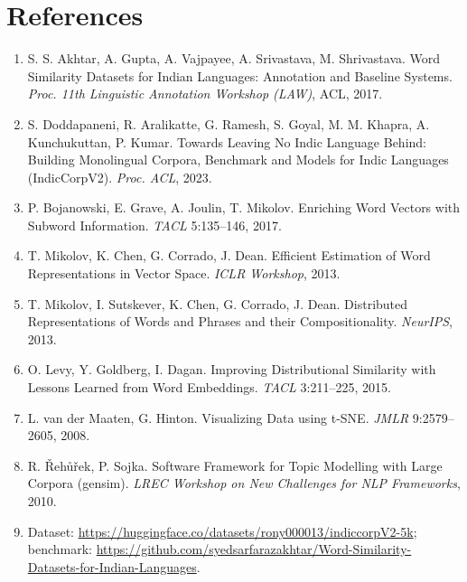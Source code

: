 \documentclass[11pt,a4paper]{article}
\begin{document}
\section*{References}
\small
\begin{enumerate}\setlength{\itemsep}{1pt}
\item S. S. Akhtar, A. Gupta, A. Vajpayee, A. Srivastava, M. Shrivastava. Word Similarity Datasets for Indian Languages: Annotation and Baseline Systems. \textit{Proc. 11th Linguistic Annotation Workshop (LAW)}, ACL, 2017.
\item S. Doddapaneni, R. Aralikatte, G. Ramesh, S. Goyal, M. M. Khapra, A. Kunchukuttan, P. Kumar. Towards Leaving No Indic Language Behind: Building Monolingual Corpora, Benchmark and Models for Indic Languages (IndicCorpV2). \textit{Proc. ACL}, 2023.
\item P. Bojanowski, E. Grave, A. Joulin, T. Mikolov. Enriching Word Vectors with Subword Information. \textit{TACL} 5:135--146, 2017.
\item T. Mikolov, K. Chen, G. Corrado, J. Dean. Efficient Estimation of Word Representations in Vector Space. \textit{ICLR Workshop}, 2013.
\item T. Mikolov, I. Sutskever, K. Chen, G. Corrado, J. Dean. Distributed Representations of Words and Phrases and their Compositionality. \textit{NeurIPS}, 2013.
\item O. Levy, Y. Goldberg, I. Dagan. Improving Distributional Similarity with Lessons Learned from Word Embeddings. \textit{TACL} 3:211--225, 2015.
\item L. van der Maaten, G. Hinton. Visualizing Data using t-SNE. \textit{JMLR} 9:2579--2605, 2008.
\item R. Řehůřek, P. Sojka. Software Framework for Topic Modelling with Large Corpora (gensim). \textit{LREC Workshop on New Challenges for NLP Frameworks}, 2010.
\item Dataset: \url{https://huggingface.co/datasets/rony000013/indiccorpV2-5k}; benchmark: \url{https://github.com/syedsarfarazakhtar/Word-Similarity-Datasets-for-Indian-Languages}.
\end{enumerate}
\end{document}
